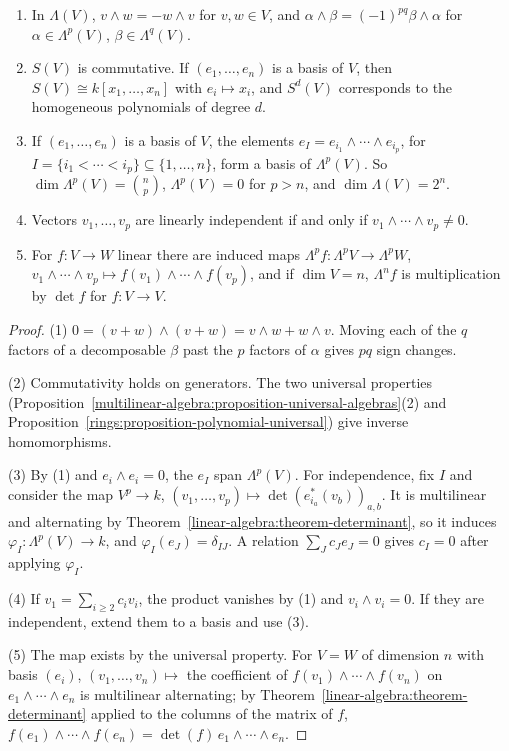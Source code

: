 \begin{proposition}\label{multilinear-algebra:proposition-exterior-properties}
\begin{enumerate}
\item In $\Lambda(V)$, $v \wedge w = -w \wedge v$ for $v, w \in V$, and $\alpha \wedge \beta = (-1)^{pq}\beta \wedge \alpha$ for
$\alpha \in \Lambda^p(V)$, $\beta \in \Lambda^q(V)$.
\item $S(V)$ is commutative. If $(e_1, \ldots, e_n)$ is a basis of $V$, then $S(V) \cong k[x_1, \ldots, x_n]$ with
$e_i \mapsto x_i$, and $S^d(V)$ corresponds to the homogeneous polynomials of degree $d$.
\item If $(e_1, \ldots, e_n)$ is a basis of $V$, the elements $e_I = e_{i_1} \wedge \cdots \wedge e_{i_p}$, for
$I = \{i_1 < \cdots < i_p\} \subseteq \{1, \ldots, n\}$, form a basis of $\Lambda^p(V)$. So
$\dim \Lambda^p(V) = \binom{n}{p}$, $\Lambda^p(V) = 0$ for $p > n$, and $\dim\Lambda(V) = 2^n$.
\item Vectors $v_1, \ldots, v_p$ are linearly independent if and only if $v_1 \wedge \cdots \wedge v_p \neq 0$.
\item For $f \colon V \to W$ linear there are induced maps $\Lambda^p f \colon \Lambda^p V \to \Lambda^p W$,
$v_1 \wedge \cdots \wedge v_p \mapsto f(v_1) \wedge \cdots \wedge f(v_p)$, and if $\dim V = n$, $\Lambda^n f$ is multiplication by
$\det f$ for $f \colon V \to V$.
\end{enumerate}
\end{proposition}

\begin{proof}
(1) $0 = (v + w) \wedge (v + w) = v \wedge w + w \wedge v$. Moving each of the $q$ factors of a decomposable $\beta$
past the $p$ factors of $\alpha$ gives $pq$ sign changes.

(2) Commutativity holds on generators. The two universal properties
(Proposition~\ref{multilinear-algebra:proposition-universal-algebras}(2) and
Proposition~\ref{rings:proposition-polynomial-universal}) give inverse homomorphisms.

(3) By (1) and $e_i \wedge e_i = 0$, the $e_I$ span $\Lambda^p(V)$. For independence, fix $I$ and consider the
map $V^p \to k$, $(v_1, \ldots, v_p) \mapsto \det(e_{i_a}^*(v_b))_{a,b}$. It is multilinear and alternating by
Theorem~\ref{linear-algebra:theorem-determinant}, so it induces $\varphi_I \colon \Lambda^p(V) \to k$, and
$\varphi_I(e_J) = \delta_{IJ}$. A relation $\sum_J c_J e_J = 0$ gives $c_I = 0$ after applying $\varphi_I$.

(4) If $v_1 = \sum_{i \geq 2} c_i v_i$, the product vanishes by (1) and $v_i \wedge v_i = 0$. If they are independent,
extend them to a basis and use (3).

(5) The map exists by the universal property. For $V = W$ of dimension $n$ with basis $(e_i)$,
$(v_1, \ldots, v_n) \mapsto$ the coefficient of $f(v_1) \wedge \cdots \wedge f(v_n)$ on $e_1 \wedge \cdots \wedge e_n$ is multilinear
alternating; by Theorem~\ref{linear-algebra:theorem-determinant} applied to the columns of the matrix
of $f$, $f(e_1) \wedge \cdots \wedge f(e_n) = \det(f)\, e_1 \wedge \cdots \wedge e_n$.
\end{proof}


